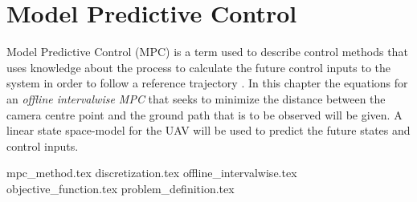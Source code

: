 \chapter[Model Predictive Control]{Model Predictive Control}
\label{ch:optimization}

Model Predictive Control (MPC) is a term used to describe control methods that uses knowledge about the process to calculate the future control inputs to the system in order to follow a reference trajectory \cite{mpcCAMACHO}. In this chapter the equations for an \textit{offline intervalwise MPC} that seeks to minimize the distance between the camera centre point and the ground path that is to be observed will be given. A linear state space-model for the UAV will be used to predict the future states and control inputs.


{mpc_method.tex}
{discretization.tex}
{offline_intervalwise.tex}
{objective_function.tex}
{problem_definition.tex}
